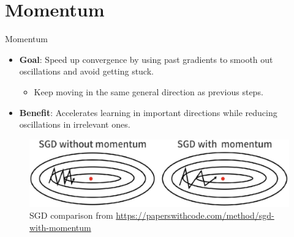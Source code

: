 \documentclass[serif, aspectratio=169]{beamer}
\begin{document}
\section{Momentum}
\begin{frame}{Momentum}
    \begin{minipage}{0.5\textwidth}
        \begin{itemize}
            \item \textbf{Goal}: Speed up convergence by using past gradients to smooth out oscillations and avoid getting stuck.
            \begin{itemize}
                \item Keep moving in the same general direction as previous steps.
            \end{itemize}
            \item \textbf{Benefit}: Accelerates learning in important directions while reducing oscillations in irrelevant ones.
        \end{itemize}
    \end{minipage}%
    \begin{minipage}{0.5\linewidth}
    \begin{figure}[h]
        \centering
        \includegraphics[height=.25\textheight]{pic/momentum_paperswithcode.jpg}
        \caption{SGD comparison from \url{https://paperswithcode.com/method/sgd-with-momentum}}
    \end{figure}
    \end{minipage}
\end{frame}
\end{document}
